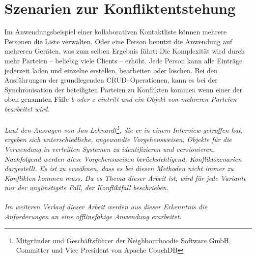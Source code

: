 \section{\label{chap:konfliktszenarien}Szenarien zur Konfliktentstehung}
Im Anwendungsbeispiel einer kollaborativen Kontaktliste können mehrere Personen die Liste verwalten. Oder eine Person benutzt die Anwendung auf mehreren Geräten, was zum selben Ergebnis führt:
Die Komplexität wird durch mehr Parteien -- beliebig viele Clients -- erhöht.
Jede Person kann alle Einträge jederzeit laden und einzelne erstellen, bearbeiten oder löschen. Bei den Ausführungen der grundlegenden \gls{CRUD}--Operationen, kann es bei der Synchronisation der beteiligten Parteien zu Konflikten kommen wenn einer der oben genannten Fälle \it{b} oder \it{c} eintritt und ein Objekt von mehreren Parteien bearbeitet wird.\\\\
Laut den Aussagen von Jan Lehnardt\footnote{ Mitgründer und Geschäftsführer der Neighbourhoodie Software GmbH, Committer und Vice President von Apache CouchDB}, die er in einem Interview getroffen hat, ergeben sich unterschiedliche, angewandte Vorgehensweisen, Objekte für die Verwendung in verteilten Systemen zu identifizieren und versionieren.
Nachfolgend werden diese Vorgehensweisen berücksichtigend, Konfliktszenarien dargestellt.
Es ist zu erwähnen, dass es bei diesen Methoden nicht immer zu Konflikten kommen muss.
Da es Thema dieser Arbeit ist, wird für jede Variante nur der ungünstigste Fall, der Konfliktfall beschrieben.
%
\\\\
Im weiteren Verlauf dieser Arbeit werden aus dieser Erkenntnis die Anforderungen an eine offlinefähige Anwendung erarbeitet.